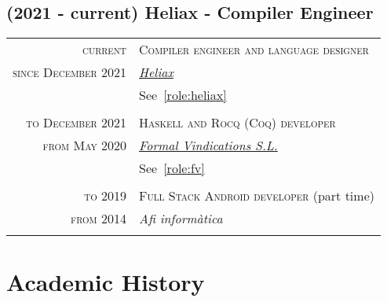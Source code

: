 \documentclass[11pt]{article}
\begin{document}
\subsection*{(2021 - current) Heliax - Compiler Engineer}
\vspace{0.2cm}
\begin{tabular}{r|p{11cm}}
  \textsc{current} & \textsc{Compiler engineer and language designer} \\
  \textsc{since December 2021} & \href{https://heliax.dev/}{\emph{Heliax}} \\
   & See~\cref{role:heliax} \\
  \multicolumn{2}{c}{} \\
  \textsc{to December 2021} & \textsc{Haskell and Rocq (Coq) developer} \\
  \textsc{from May 2020} & \href{https://formalv.com/}{\emph{Formal Vindications S.L.}} \\
   & See~\cref{role:fv} \\
  \multicolumn{2}{c}{} \\
  \textsc{to 2019} & \textsc{Full Stack Android developer} (part time) \\
  \textsc{from 2014} & \emph{Afi informàtica} \\
  \multicolumn{2}{c}{} \\

\end{tabular}

\section{Academic History}
\end{document}
